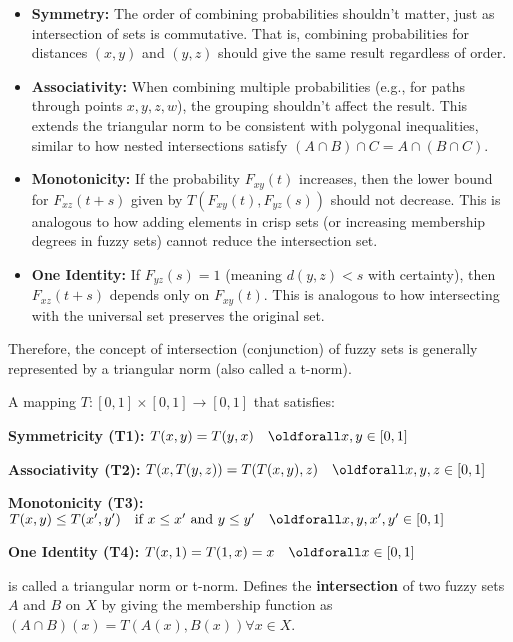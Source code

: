 \begin{itemize}
  \item \textbf{Symmetry:} The order of combining probabilities shouldn't matter, just as intersection of sets is commutative. That is, combining probabilities for distances $(x,y)$ and $(y,z)$ should give the same result regardless of order.
  
  \item \textbf{Associativity:} When combining multiple probabilities (e.g., for paths through points $x,y,z,w$), the grouping shouldn't affect the result. This extends the triangular norm to be consistent with polygonal inequalities, similar to how nested intersections satisfy $(A \cap B) \cap C = A \cap (B \cap C)$.
  
  \item \textbf{Monotonicity:} If the probability $F_{xy}(t)$ increases, then the lower bound for $F_{xz}(t+s)$ given by $T(F_{xy}(t), F_{yz}(s))$ should not decrease. This is analogous to how adding elements in crisp sets (or increasing membership degrees in fuzzy sets) cannot reduce the intersection set.
  
  \item \textbf{One Identity:} If $F_{yz}(s) = 1$ (meaning $d(y,z) < s$ with certainty), then $F_{xz}(t+s)$ depends only on $F_{xy}(t)$. This is analogous to how intersecting with the universal set preserves the original set.
\end{itemize}
Therefore, the concept of intersection (conjunction) of fuzzy sets is generally represented by a triangular norm (also called a t-norm).
\begin{definition}
    A mapping $T:[0,1]\times [0,1] \longrightarrow [0,1]$ that satisfies:
    \begin{romanenum}
      \item \textbf{Symmetricity (T1):} $T(x,y) = T(y,x) \quad \oldforall x,y \in [0,1]$
      \item \textbf{Associativity (T2):} $T(x,T(y,z)) = T(T(x,y),z) \quad \oldforall x,y,z \in [0,1]$
      \item \textbf{Monotonicity (T3):} $T(x,y) \leq T(x',y') \quad \textnormal{if }x\leq x' \textnormal{ and } y\leq y' \quad \oldforall x,y,x',y' \in [0,1]$
      \item \textbf{One Identity (T4):} $T(x,1) = T(1,x) = x \quad \oldforall x \in [0,1]$
    \end{romanenum}
    is called a triangular norm or t-norm. Defines the \textbf{intersection} of two fuzzy sets $A$ and $B$ on $X$ by giving the membership function as $(A \cap B) (x) = T(A(x),B(x)) \forall x \in X$.
\end{definition}
